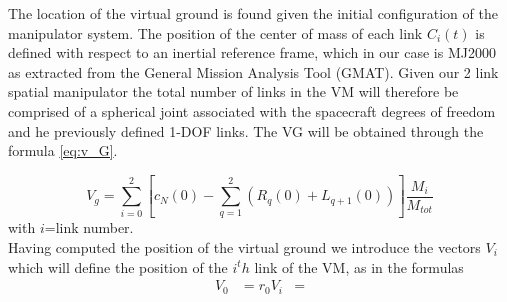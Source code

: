 \documentclass[main.tex]{subfiles}
\begin{document}
The location of the virtual ground is found given the initial configuration of the manipulator system. The position of the center of mass of each link $C_i (t)$ is defined with respect to an inertial reference frame, which in our case is MJ2000 as extracted from the General Mission Analysis Tool (GMAT). Given our 2 link spatial manipulator the total number of links in the VM will therefore be comprised of a spherical joint associated with the spacecraft degrees of freedom and he previously defined 1-DOF links. The VG will be obtained through the formula \ref{eq:v_G}.

\begin{equation}
    V_g = \sum^2_{i=0}\left[c_N(0)-\sum_{q=1}^2(R_q(0)+L_{q+1}(0))\right]\frac{M_i}{M_{tot}}
    \label{eq:v_G}
\end{equation}
with $i$=link number.\\

Having computed the position of the virtual ground we introduce the vectors $V_i$ which will define the position of the $i^th$ link of the VM, as in the formulas \
\begin{align*}
      V_0&=r_0
    V_i&=
\end{align*}
\end{document}
